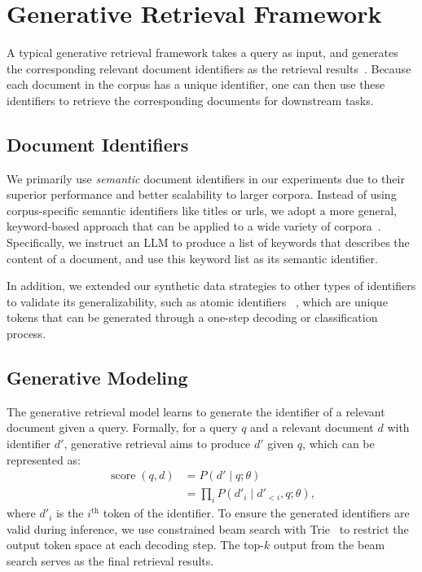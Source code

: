 \section{Generative Retrieval Framework}
A typical generative retrieval framework takes a query as input, and generates the corresponding relevant document identifiers as the retrieval results~\citep{DBLP:conf/nips/Tay00NBM000GSCM22}. Because each document in the corpus has a unique identifier, one can then use these identifiers to retrieve the corresponding documents for downstream tasks.

\subsection{Document Identifiers}
We primarily use \textit{semantic} document identifiers in our experiments due to their superior performance and better scalability to larger corpora.
Instead of using corpus-specific semantic identifiers like titles or urls, we adopt a more general, keyword-based approach that can be applied to a wide variety of corpora~\citep{DBLP:journals/corr/abs-2208-09257}.
Specifically, we instruct an LLM to produce a list of keywords that describes the content of a document, and use this keyword list as its semantic identifier.

In addition, we extended our synthetic data strategies to other types of identifiers to validate its generalizability, such as atomic identifiers ~\citep{DBLP:conf/nips/Tay00NBM000GSCM22}, which are unique tokens that can be generated through a one-step decoding or classification process.

\subsection{Generative Modeling}
The generative retrieval model learns to generate the identifier of a relevant document given a query. Formally, for a query $q$ and a relevant document $d$ with identifier $d'$, generative retrieval aims to produce $d'$ given $q$, which can be represented as:
\newcommand{\score}[1]{\operatorname{score}(#1)}
\begin{align*}
\score{q,d} &= P\left(d'\mid q; \theta\right) \\
&= \prod_{i}P\left(d'_i \mid d'_{<i}, q; \theta \right),
\end{align*}
where $d'_{i}$ is the $i^\text{th}$ token of the identifier. To ensure the generated identifiers are valid during inference, we use constrained beam search with Trie~\citep{DBLP:journals/corr/abs-2010-00904} to restrict the output token space at each decoding step. The top-$k$ output from the beam search serves as the final retrieval results.

